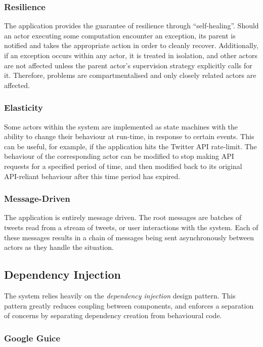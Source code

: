\documentclass{l4proj}
\begin{document}
            \subsubsection{Resilience}
            The application provides the guarantee of resilience through ``self-healing''. Should an actor executing some computation encounter an exception, its parent is notified and takes the appropriate action in order to cleanly recover. Additionally, if an exception occurs within any actor, it is treated in isolation, and other actors are not affected unless the parent actor's supervision strategy explicitly calls for it. Therefore, problems are compartmentalised and only closely related actors are affected.
            
            \subsubsection{Elasticity}
            Some actors within the system are implemented as state machines with the ability to change their behaviour at run-time, in response to certain events. This can be useful, for example, if the application hits the Twitter API rate-limit. The behaviour of the corresponding actor can be modified to stop making API requests for a specified period of time, and then modified back to its original API-reliant behaviour after this time period has expired.
            
            \subsubsection{Message-Driven}
            The application is entirely message driven. The root messages are batches of tweets read from a stream of tweets, or user interactions with the system. Each of these messages results in a chain of messages being sent asynchronously between actors as they handle the situation.       
        
        \subsection{Dependency Injection}
        
        The system relies heavily on the \textit{dependency injection} design pattern. This pattern greatly reduces coupling between components, and enforces a separation of concerns by separating dependency creation from behavioural code.
        
            \subsubsection{Google Guice}
                
\end{document}

